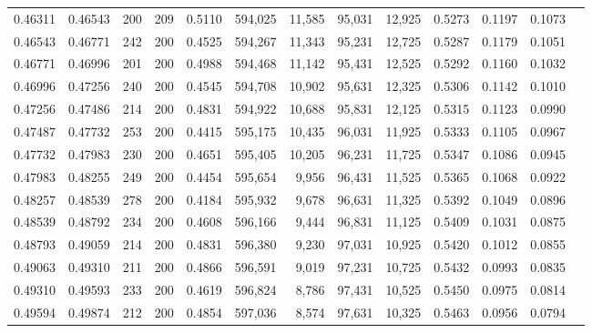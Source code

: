 \begin{tabular}{rrrrrrrrrrrrr}
0.46311 & 0.46543 &    200 & 209 &                                     0.5110 & 594,025 &  11,585 &  95,031 &  12,925 & 0.5273 & 0.1197 & 0.1073 \\
0.46543 & 0.46771 &    242 & 200 &                                     0.4525 & 594,267 &  11,343 &  95,231 &  12,725 & 0.5287 & 0.1179 & 0.1051 \\
0.46771 & 0.46996 &    201 & 200 &                                     0.4988 & 594,468 &  11,142 &  95,431 &  12,525 & 0.5292 & 0.1160 & 0.1032 \\
0.46996 & 0.47256 &    240 & 200 &                                     0.4545 & 594,708 &  10,902 &  95,631 &  12,325 & 0.5306 & 0.1142 & 0.1010 \\
0.47256 & 0.47486 &    214 & 200 &                                     0.4831 & 594,922 &  10,688 &  95,831 &  12,125 & 0.5315 & 0.1123 & 0.0990 \\
0.47487 & 0.47732 &    253 & 200 &                                     0.4415 & 595,175 &  10,435 &  96,031 &  11,925 & 0.5333 & 0.1105 & 0.0967 \\
0.47732 & 0.47983 &    230 & 200 &                                     0.4651 & 595,405 &  10,205 &  96,231 &  11,725 & 0.5347 & 0.1086 & 0.0945 \\
0.47983 & 0.48255 &    249 & 200 &                                     0.4454 & 595,654 &   9,956 &  96,431 &  11,525 & 0.5365 & 0.1068 & 0.0922 \\
0.48257 & 0.48539 &    278 & 200 &                                     0.4184 & 595,932 &   9,678 &  96,631 &  11,325 & 0.5392 & 0.1049 & 0.0896 \\
0.48539 & 0.48792 &    234 & 200 &                                     0.4608 & 596,166 &   9,444 &  96,831 &  11,125 & 0.5409 & 0.1031 & 0.0875 \\
0.48793 & 0.49059 &    214 & 200 &                                     0.4831 & 596,380 &   9,230 &  97,031 &  10,925 & 0.5420 & 0.1012 & 0.0855 \\
0.49063 & 0.49310 &    211 & 200 &                                     0.4866 & 596,591 &   9,019 &  97,231 &  10,725 & 0.5432 & 0.0993 & 0.0835 \\
0.49310 & 0.49593 &    233 & 200 &                                     0.4619 & 596,824 &   8,786 &  97,431 &  10,525 & 0.5450 & 0.0975 & 0.0814 \\
0.49594 & 0.49874 &    212 & 200 &                                     0.4854 & 597,036 &   8,574 &  97,631 &  10,325 & 0.5463 & 0.0956 & 0.0794 \\

\end{tabular}
